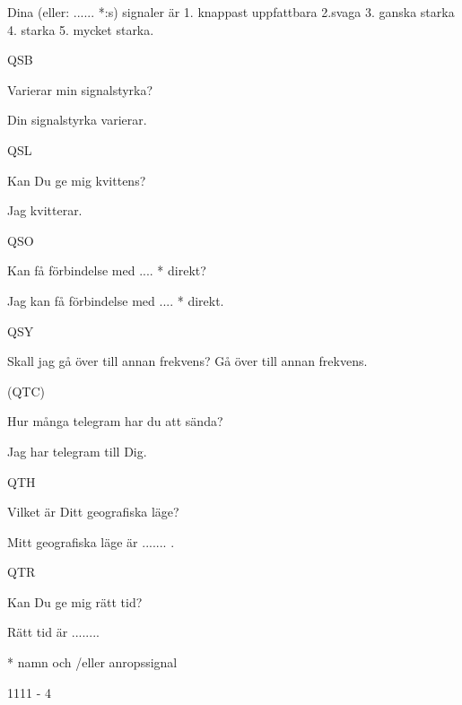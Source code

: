 Dina (eller: ...... *:s) signaler är
1. knappast uppfattbara
2.svaga
3. ganska starka
4. starka
5. mycket starka.

QSB

Varierar min signalstyrka?

Din signalstyrka varierar.

QSL

Kan Du ge mig kvittens?

Jag kvitterar.

QSO

Kan
få förbindelse med
.... * direkt?

Jag kan få förbindelse med .... * direkt.

QSY

Skall jag gå över till annan frekvens? Gå över till annan frekvens.

(QTC)

Hur många telegram har du att
sända?

Jag har telegram till Dig.

QTH

Vilket är Ditt geografiska läge?

Mitt geografiska läge är ....... .

QTR

Kan Du ge mig rätt tid?

Rätt tid är ........

* namn och /eller anropssignal

1111 - 4

